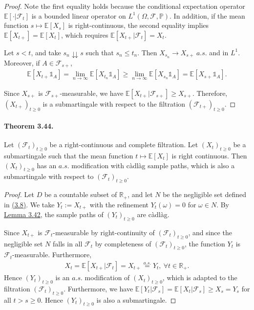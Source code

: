 \documentclass{article}
\numberwithin{equation}{section}
\newcommand{\E}{\mathbb{E}}
\renewcommand{\P}{\mathbb{P}}
\theoremstyle{plain}
\theoremstyle{definition}
\begin{document}
\begin{proof}
Note the first equality holds because the conditional expectation operator $\E[\cdot|\mathscr{F}_t]$ is a bounded linear operator on $L^1(\Omega,\mathscr{F},\P)$. In addition, if the mean function $s\mapsto \E[X_s]$ is right-continuous, the second equality implies $\E[X_{t+}]=\E[X_t]$, which requires $\E[X_{t+}|\mathscr{F}_t]=X_t$.

Let $s<t$, and take $s_n\downdownarrows s$ such that $s_n\leq t_n$. Then $X_{s_n}\to X_{s+}\ a.s.$ and in $L^1$. Moreover, if $A\in\mathscr{F}_{s+}$, 
\begin{align*}
	\E[X_{t+}\mathds{1}_A] = \lim_{n\to\infty}\E[X_{t_n}\mathds{1}_A]\geq \lim_{n\to\infty}\E[X_{s_n}\mathds{1}_A] = \E[X_{s+}\mathds{1}_A].
\end{align*}

Since $X_{s+}$ is $\mathscr{F}_{s+}$-measurable, we have $\E[X_{t+}|\mathscr{F}_{s+}]\geq X_{s+}$. Therefore, $(X_{t+})_{t\geq 0}$ is a submartingale with respect to the filtration $(\mathscr{F}_{t+})_{t\geq 0}$.
\end{proof}

\paragraph{Theorem 3.44.\label{thm:3.44}} Let $(\mathscr{F}_t)_{t\geq 0}$ be a right-continuous and complete filtration. Let $(X_t)_{t\geq 0}$ be a submartingale such that the mean function $t\mapsto \E[X_t]$ is right continuous. Then $(X_t)_{t\geq 0}$ has an $a.s.$ modification with càdlàg sample paths, which is also a submartingale with respect to $(\mathscr{F}_t)_{t\geq 0}$.
\begin{proof}
Let $D$ be a countable subset of $\mathbb{R}_+$, and let $N$ be the negligible set defined in \hyperref[eq:3.8]{(3.8)}. We take $Y_t:=X_{t+}$ with the refinement $Y_t(\omega)=0$ for $\omega\in N$. By \hyperref[lemma:3.42]{Lemma 3.42}, the sample paths of $(Y_t)_{t\geq 0}$ are càdlàg.

Since $X_{t+}$ is $\mathscr{F}_t$-measurable by right-continuity of $(\mathscr{F}_t)_{t\geq 0}$, and since the negligible set $N$ falls in all $\mathscr{F}_t$ by completeness of $(\mathscr{F}_t)_{t\geq 0}$, the function $Y_t$ is $\mathscr{F}_t$-measurable. Furthermore,
\begin{align*}
	X_t = \E[X_{t+}|\mathscr{F}_t] = X_{t+} \overset{a.s.}{=} Y_t,\ \forall t\in\mathbb{R}_+.
\end{align*}
Hence $(Y_t)_{t\geq 0}$ is an $a.s.$ modification of $(X_t)_{t\geq 0}$, which is adapted to the filtration $(\mathscr{F}_t)_{t\geq 0}$. Furthermore, we have $\E[Y_t|\mathscr{F}_s]=\E[X_t|\mathscr{F}_s]\geq X_s=Y_s$ for all $t>s\geq 0$. Hence $(Y_t)_{t\geq 0}$ is also a submartingale.
\end{proof} 
\end{document}
